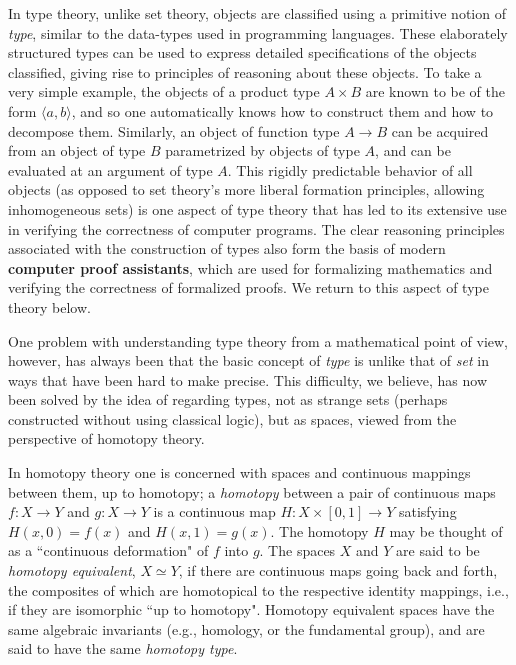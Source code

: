 {%

In type theory, unlike set theory, objects are classified using a primitive notion of \emph{type}, similar to the data-types used in programming languages.  These elaborately structured types can be used to express detailed specifications of the objects classified, giving rise to principles of reasoning about these objects.  To take a very simple example, the objects of a product type $A\times B$ are known to be of the form $\langle a, b\rangle$, and so one automatically knows how to construct them and how to decompose them. Similarly, an object of function type $A\to B$ can be acquired from an object of type $B$ parametrized by objects of type $A$, and can be evaluated at an argument of type $A$.  This rigidly predictable behavior of all objects (as opposed to set theory's more liberal formation principles, allowing inhomogeneous sets) is one aspect of type theory that has led to its extensive use in verifying the correctness of computer programs.  The clear reasoning principles associated with the construction of types also form the basis of modern {\bf computer proof assistants}, which are used for formalizing mathematics and verifying the correctness of formalized proofs.  We return to this aspect of type theory below.  



One problem with understanding type theory from a mathematical point of view, however, has always been that the basic concept of \emph{type} is unlike that of \emph{set} in ways that have been hard to make precise. This difficulty, we believe, has now been solved by the idea of regarding types, not as strange sets (perhaps constructed without using classical logic), but as spaces, viewed from the perspective of homotopy theory.

In homotopy theory one is concerned with spaces and continuous mappings between them, 
up to homotopy; a \emph{homotopy} between a pair of continuous maps $f \colon X	\to Y$
and  $g \colon X	\to Y$ is 
a continuous map $H \colon X \times [0, 1]	\to Y$ satisfying
$H(x, 0) = f (x)$  and $H(x, 1) = g(x)$. The homotopy $H$ may be thought of as a ``continuous deformation" of $f$ into $g$. The spaces $X$ and $Y$ are said to be \emph{homotopy equivalent}, $X\simeq Y$, if there are continuous maps going back and forth, the composites of which are homotopical to the respective identity mappings, i.e., if they are isomorphic ``up to homotopy".  Homotopy equivalent spaces have the same algebraic invariants (e.g., homology, or the fundamental group), and are said to have the same \emph{homotopy type}.

}

